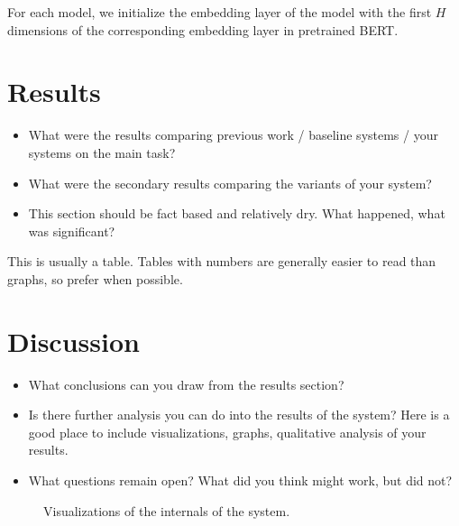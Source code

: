 \documentclass[11pt]{article}
\begin{document}
For each model, we initialize the embedding layer of the model with the
first $H$ dimensions of the corresponding embedding layer in pretrained
BERT. 



\section{Results}

\begin{itemize}
\item What were the results comparing previous work / baseline systems / your systems on the main task?
\item What were the secondary results comparing the variants of your system?
\item This section should be fact based and relatively dry. What happened, what was significant?
\end{itemize}

\begin{table*}
  \centering
  \missingfigure{}
  \caption{This is usually a table. Tables with numbers are generally easier to read than graphs, so prefer when possible.}
  \label{fig:mainres}
\end{table*}





\section{Discussion}



\begin{itemize}
\item What conclusions can you draw from the results section?
\item Is there further analysis you can do into the results of the system? Here is a good place to include visualizations, graphs, qualitative analysis of your results.

\item  What questions remain open? What did you think might work, but did not?
\end{itemize}



\begin{figure}
  \centering
  \missingfigure{}
  \missingfigure{}
  \missingfigure{}
  \caption{Visualizations of the internals of the system.}
\end{figure}
\end{document}
